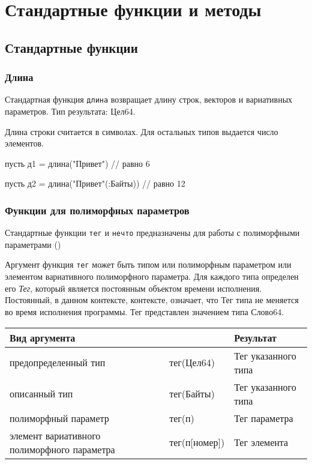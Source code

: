 \hypertarget{stdfuncs}{%
\section{Стандартные функции и методы}\label{stdfuncs:chapter}}

\hypertarget{std-funcs}{%
\subsection{Стандартные функции}\label{stdfuncs:std-funcs}}

\hypertarget{stdlen}{%
\subsubsection{Длина}\label{stdfuncs:stdlen}}

Стандартная функция \verb+длина+ возвращает длину строк, векторов и вариативных параметров. Тип результата: Цел64.

Длина строки считается в символах. Для остальных типов выдается число элементов.

\begin{Trivil}
    пусть д1 = длина("Привет") // равно 6

    пусть д2 = длина("Привет"(:Байты)) // равно 12
\end{Trivil}

\hypertarget{stdpoly}{%
\subsubsection{Функции для полиморфных параметров}\label{stdfuncs:stdpoly}}

Стандартные функции \verb+тег+ и \verb+нечто+ предназначены для работы с полиморфными параметрами ()

Аргумент функция \verb+тег+ может быть типом или полиморфным параметром или элементом вариативного полиморфного параметра. 
Для каждого типа определен его \emph{Тег}, который является постоянным объектом времени исполнения. 
Постоянный, в данном контексте, контексте, означает, что Тег типа не меняется во время исполнения программы.
Тег представлен значением типа Слово64.

\bigskip
\begin{tabular}[c]{p{4cm}|l|l}
 \multicolumn{2}{l|}{\textbf{Вид аргумента}}   & \textbf{Результат}  \\ 
\hline
предопределенный тип & тег(Цел64) &  Тег указанного типа \\
описанный тип & тег(Байты) &  Тег указанного типа \\
полиморфный параметр & тег(п) & Тег параметра \\
элемент вариативного полиморфного параметра & тег(п[номер]) & Тег элемента \\
\hline
\end{tabular}

